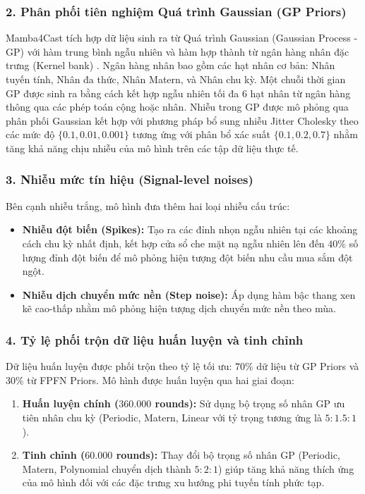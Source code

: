 \subsubsection{2. Phân phối tiên nghiệm Quá trình Gaussian (GP Priors)}
Mamba4Cast tích hợp dữ liệu sinh ra từ Quá trình Gaussian (Gaussian Process - GP) với hàm trung bình ngẫu nhiên và hàm hợp thành từ ngân hàng nhân đặc trưng (Kernel bank) \cite{gardner2018}. Ngân hàng nhân bao gồm các hạt nhân cơ bản: Nhân tuyến tính, Nhân đa thức, Nhân Matern, và Nhân chu kỳ. Một chuỗi thời gian GP được sinh ra bằng cách kết hợp ngẫu nhiên tối đa 6 hạt nhân từ ngân hàng thông qua các phép toán cộng hoặc nhân. Nhiễu trong GP được mô phỏng qua phân phối Gaussian kết hợp với phương pháp bổ sung nhiễu Jitter Cholesky theo các mức độ $\{0.1, 0.01, 0.001\}$ tương ứng với phân bổ xác suất $\{0.1, 0.2, 0.7\}$ nhằm tăng khả năng chịu nhiễu của mô hình trên các tập dữ liệu thực tế.

\subsubsection{3. Nhiễu mức tín hiệu (Signal-level noises)}
Bên cạnh nhiễu trắng, mô hình đưa thêm hai loại nhiễu cấu trúc:
\begin{itemize}
    \item \textbf{Nhiễu đột biến (Spikes):} Tạo ra các đỉnh nhọn ngẫu nhiên tại các khoảng cách chu kỳ nhất định, kết hợp cửa sổ che mặt nạ ngẫu nhiên lên đến $40\%$ số lượng đỉnh đột biến để mô phỏng hiện tượng đột biến nhu cầu mua sắm đột ngột.
    \item \textbf{Nhiễu dịch chuyển mức nền (Step noise):} Áp dụng hàm bậc thang xen kẽ cao-thấp nhằm mô phỏng hiện tượng dịch chuyển mức nền theo mùa.
\end{itemize}

\subsubsection{4. Tỷ lệ phối trộn dữ liệu huấn luyện và tinh chỉnh}
Dữ liệu huấn luyện được phối trộn theo tỷ lệ tối ưu: $70\%$ dữ liệu từ GP Priors và $30\%$ từ FPFN Priors. Mô hình được huấn luyện qua hai giai đoạn:
\begin{enumerate}
    \item \textbf{Huấn luyện chính ($360.000$ rounds):} Sử dụng bộ trọng số nhân GP ưu tiên nhân chu kỳ (Periodic, Matern, Linear với tỷ trọng tương ứng là $5 : 1.5 : 1$).
    \item \textbf{Tinh chỉnh ($60.000$ rounds):} Thay đổi bộ trọng số nhân GP (Periodic, Matern, Polynomial chuyển dịch thành $5 : 2 : 1$) giúp tăng khả năng thích ứng của mô hình đối với các đặc trưng xu hướng phi tuyến tính phức tạp.
\end{enumerate}


